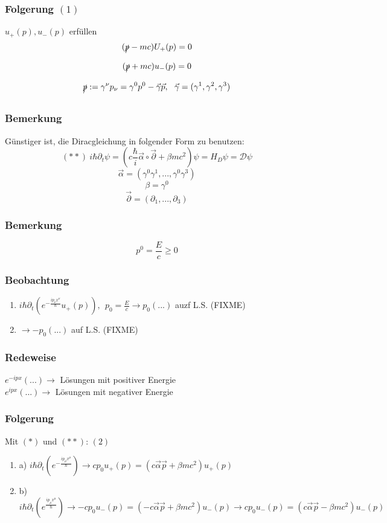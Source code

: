 \documentclass[twoside,a4paper]{scrartcl}
\newcommand{\D}{\mathcal{D}}
\renewcommand{\1}{\mathds{1}}
\newcommand{\ra}{\rightarrow}
\begin{document}
\subsubsection*{Folgerung $(1)$}
$u_+(p), u_-(p)$ erfüllen 
$$(\xout{p}-mc)U_+(p)=0$$
$$(\xout{p}+mc)u_-(p)=0$$
$$\xout{p}:=\gamma^\nu p_\nu=\gamma^0p^0-\vec \gamma \vec p, \ \ \vec \gamma=(\gamma^1,\gamma^2,\gamma^3)$$
\subsubsection*{Bemerkung}
Günstiger ist, die Diracgleichung in folgender Form zu benutzen:
$$(**) \ i\hbar \partial_t \psi=(c \frac{\hbar}{i} \vec \alpha \circ \vec \partial + \beta mc^2)\psi=H_D \psi=\D\psi$$
$$\vec \alpha=(\gamma^0\gamma^1,...,\gamma^0\gamma^3)$$
$$\beta=\gamma^0$$
$$\vec \partial =(\partial_1,...,\partial_3)$$
\subsubsection*{Bemerkung}
$$p^0=\frac{E}{c}\geq 0$$
\subsubsection*{Beobachtung}
\begin{enumerate}
\item $i\hbar \partial_t (e^{-\frac{ip_\nu x^\nu}{\hbar}}u_+(p)), \ \ p_0=\frac{E}{c} \ra p_0(...)$ auzf L.S. (FIXME)
\item $\ra -p_0(...)$ auf L.S. (FIXME) 
\end{enumerate}
\subsubsection*{Redeweise}
$e^{-ipx}(...) \ra$ Lösungen mit positiver Energie\\
$e^{ipx}(...) \ra$ Lösungen mit negativer Energie\\
\subsubsection*{Folgerung}
Mit $(*)$ und $(**)$: $(2)$ 
\begin{enumerate}
\item a) $i\hbar \partial_t(e^{-\frac{ip_\mu x^\mu}{\hbar}}) \ra cp_0 u_+(p)=(c \vec \alpha \vec p +\beta mc^2)u_+(p)$
\item b) $i\hbar \partial_t(e^{\frac{ip_\mu x^\mu}{\hbar}}) \ra -cp_0 u_-(p)=(-c \vec \alpha \vec p +\beta mc^2)u_-(p) \ra cp_0 u_-(p)=(c \vec \alpha \vec p -\beta mc^2)u_-(p)$
\end{enumerate}
\end{document}
